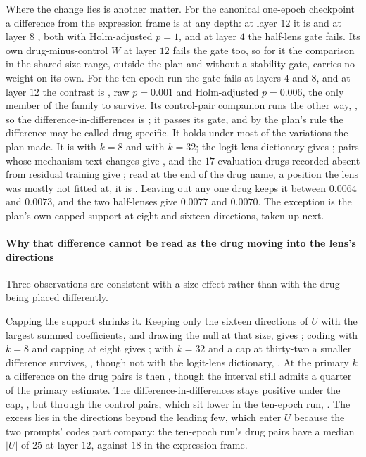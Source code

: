 Where the change lies is another matter. For the canonical one-epoch checkpoint a
difference from the expression frame is \notestablished at any depth: at layer
$12$ it is  and at layer $8$
, both with Holm-adjusted $p = 1$, and at layer $4$
the half-lens gate fails. Its own drug-minus-control $W$ at layer $12$ fails the
gate too, so for it the comparison in the shared size range, outside the plan
and without a stability gate, carries no weight on its own. For the ten-epoch run the gate fails at layers $4$ and $8$,
and at layer $12$ the contrast is , raw
$p = 0.001$ and Holm-adjusted $p = 0.006$, the only member of the family to
survive. Its control-pair companion runs the other way,
, so the difference-in-differences is
; it passes its gate, and by the plan's rule the
difference may be called drug-specific. It holds under most of the variations
the plan made. It is  with $k = 8$ and
 with $k = 32$; the logit-lens dictionary gives
; pairs whose mechanism text changes give
, and the $17$ evaluation drugs recorded absent
from residual training give ; read at the end of
the drug name, a position the lens was mostly not fitted at, it is
. Leaving out any one drug keeps it between
$0.0064$ and $0.0073$, and the two half-lenses give $0.0077$ and $0.0070$. The
exception is the plan's own capped support at eight and sixteen directions,
taken up next.

\paragraph{Why that difference cannot be read as the drug moving into the lens's
directions} Three observations are consistent with a size effect rather than
with the drug being placed differently.

Capping the support shrinks it. Keeping only the sixteen directions of $U$ with
the largest summed coefficients, and drawing the null at that size, gives
; coding with $k = 8$ and capping at eight gives
; with $k = 32$ and a cap at thirty-two a smaller
difference survives, , though not with the
logit-lens dictionary, . At the primary $k$ a
difference on the drug pairs is then \notestablished, though the interval still
admits a quarter of the primary estimate. The difference-in-differences stays
positive under the cap, , but through the control
pairs, which sit lower in the ten-epoch run, . The
excess lies in the directions beyond the leading few, which enter $U$ because the
two prompts' codes part company: the ten-epoch run's drug pairs have a median
$|U|$ of $25$ at layer $12$, against $18$ in the expression frame.

